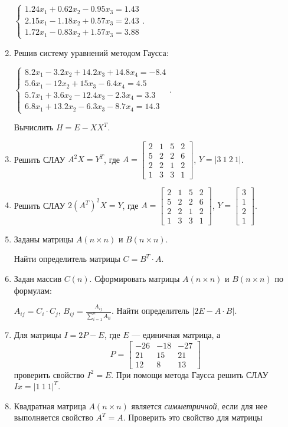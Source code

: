 \begin{enumerate}
$\left\{\begin{matrix}1.24x_1+0.62x_2-0.95x_3=1.43\\2.15x_1-1.18x_2+0.57x_3=2.43\\1.72x_1-0.83x_2+1.57x_3=3.88\end{matrix}\right.$.
\item Решив систему уравнений методом Гаусса:

$\left\{\begin{matrix}8.2x_1-3.2x_2+14.2x_3+14.8x_4=-8.4\\5.6x_1-12x_2+15x_3-6.4x_4=4.5\\5.7x_1+3.6x_2-12.4x_3-2.3x_4=3.3\\6.8x_1+13.2x_2-6.3x_3-8.7x_4=14.3\end{matrix}\right.$.

Вычислить  $H=E-XX^T$.
\item Решить СЛАУ $A^2X=Y^T$, где  $A=\left[\begin{matrix}2&1&5&2\\5&2&2&6\\2&2&1&2\\1&3&3&1\end{matrix}\right]$,
 $Y=|3\ 1\ 2\ 1|$.
\item Решить СЛАУ  $2(A^T)^2X=Y$, где 
$A=\left[\begin{matrix}2&1&5&2\\5&2&2&6\\2&2&1&2\\1&3&3&1\end{matrix}\right]$, 
$Y=\left[\begin{matrix}3\\1\\2\\1\end{matrix}\right]$.
\item Заданы матрицы $A(n\times n)$ и $B(n\times n)$. 

Найти определитель матрицы $C=B^T\cdot A$.
\item  Задан массив $C(n)$. Сформировать матрицы $A(n\times n)$ и
$B(n\times n)$ по формулам:

$A_{ij}=C_i\cdot C_j$,  $B_{ij}=\frac{A_{ij}}{\sum\limits_{i=1}^nA_{ii}}$. Найти
определитель  $|2E-A\cdot B|$.
\item Для матрицы  $I=2P-E$, где $E$ --- единичная матрица, а 
\begin{equation*}
P=\left[\begin{matrix}-26&-18&-27\\21&15&21\\12&8&13\end{matrix}\right]
\end{equation*}
проверить свойство  $I^2=E$. При помощи метода Гаусса решить СЛАУ  $Ix=|1\ 1\ 1|^T$.
\item Квадратная матрица $A(n\times n)$ является \emph{симметричной}, если для нее выполняется
свойство  $A^T=A$. Проверить это свойство для матрицы


\end{enumerate}
